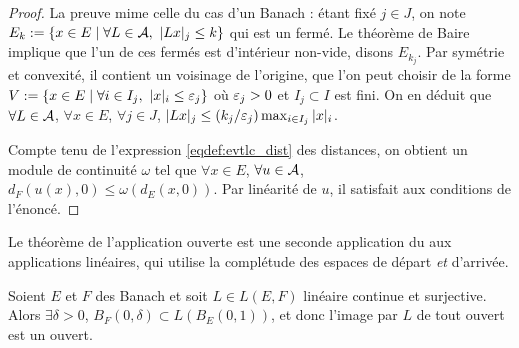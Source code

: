 \begin{proof}
	La preuve mime celle du cas d'un Banach : étant fixé $j \in J$, on note $E_k := \{x\in E \mid \forall L \in \mathcal{A},\ |Lx|_j \leq k\}$ qui est un fermé. Le théorème de Baire implique que l'un de ces fermés est d'intérieur non-vide, disons $E_{k_j}$. Par symétrie et convexité, il contient un voisinage de l'origine, que l'on peut choisir de la forme $V := \{x \in E \mid \forall i \in I_j,\ |x|_i \leq \varepsilon_j\}$ où $\varepsilon_j>0$ et $I_j \subset I$ est fini. On en déduit que $\forall L \in \mathcal{A}$, $\forall x \in E$, $\forall j \in J$, $|Lx|_j \leq (k_j/\varepsilon_j) \max_{i \in I_j} |x|_i$. 
	
	Compte tenu de l'expression \eqref{eqdef:evtlc_dist} des distances, on obtient un module de continuité $\omega$ tel que $\forall x \in E$, $\forall u \in \mathcal{A}$, $d_F(u(x),0) \leq \omega(d_E(x,0))$. Par linéarité de $u$, il satisfait aux conditions de l'énoncé. 
\end{proof}



Le théorème de l'application ouverte est une seconde application du  aux applications linéaires, qui utilise la complétude des espaces de départ \emph{et} d'arrivée. 

\begin{theorem}
\label{th:appliOuverte}
%
Soient $E$ et $F$ des Banach et soit $L \in L(E,F)$ linéaire continue et surjective. 
Alors $\exists \delta>0$, $B_F(0,\delta) \subset L(B_E(0,1))$, et donc l'image par $L$ de tout ouvert est un ouvert. %

\end{theorem}

